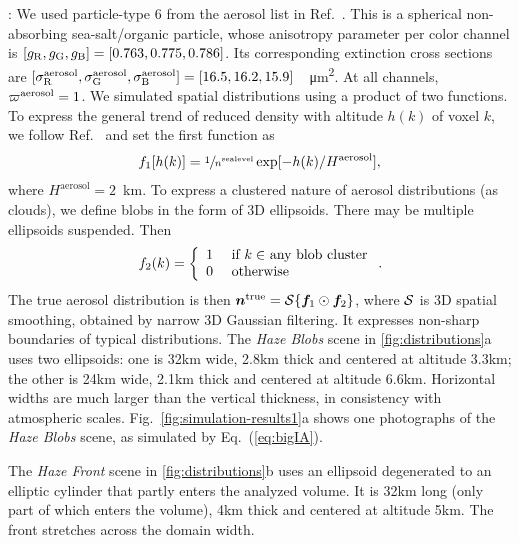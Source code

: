\documentclass[10pt,letterpaper]{article}
\begin{document}
: We used particle-type 6 from the aerosol list
in Ref.~\cite{Martonchik2009}. This is a spherical non-absorbing
sea-salt/organic particle, whose anisotropy parameter per color
channel is $[g_{\rm R},g_{\rm G},g_{\rm B}]=[0.763,0.775,0.786]$. Its
corresponding extinction cross sections are $[\sigma^{\rm
  aerosol}_{\rm R}, \sigma^{\rm aerosol}_{\rm G}, \sigma^{\rm
  aerosol}_{\rm
  B}]=[16.5,16.2,15.9]$~\si[sticky-per]{\per\micro\meter\squared}.  At
all channels, $\varpi^{\rm aerosol}=1$. We simulated spatial
distributions using a product of two functions. To express the general
trend of reduced density with altitude $h(k)$ of voxel $k$, we follow
Ref.~\cite{Levi1980} and set the first function as
\begin{align}
  f_1[h(k)] = \sfrac{1} {n^{\rm sealevel}}
  \exp[-h(k)/H^\mathrm{aerosol}],
\end{align}
where $H^\mathrm{aerosol}=2$~\si{\km}. To express a clustered nature
of aerosol distributions (as clouds), we define blobs in the form of
3D ellipsoids. There may be multiple ellipsoids suspended.  Then
\begin{equation}
  f_2(k) =
  \left\{
    \begin{array}{ll}
      1  & \mbox{ if $k\in$ any blob cluster} \\
      0  & \mbox{ otherwise}
      \label{eq:f2}
    \end{array}
  \right.
  .
  \hspace{-0.05cm}
\end{equation}
The true aerosol distribution is then ${\bm n}^{\rm true}={\cal
  S}\{{\bm f}_1\odot {\bm f}_2\}$, where ${\cal S}$ is 3D spatial
smoothing, obtained by narrow 3D Gaussian filtering. It expresses
non-sharp boundaries of typical distributions. The {\em Haze Blobs}
scene in \cref{fig:distributions}a uses two ellipsoids: one is 32km
wide, 2.8km thick and centered at altitude 3.3km; the other is 24km
wide, 2.1km thick and centered at altitude 6.6km. Horizontal widths
are much larger than the vertical thickness, in consistency with
atmospheric scales. Fig.~\ref{fig:simulation-results1}a shows one
photographs of the {\em Haze Blobs} scene, as simulated by
Eq.~(\ref{eq:bigIA}).

The {\em Haze Front} scene in \cref{fig:distributions}b uses an
ellipsoid degenerated to an elliptic cylinder that partly enters the
analyzed volume. It is 32km long (only part of which enters the
volume), 4km thick and centered at altitude 5km. The front stretches
across the domain width.
\end{document}

